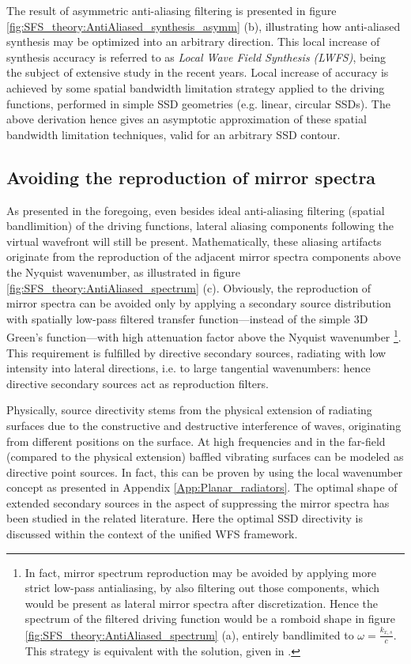 The result of asymmetric anti-aliasing filtering is presented in figure \ref{fig:SFS_theory:AntiAliased_synthesis_asymm} (b), illustrating how anti-aliased synthesis may be optimized into an arbitrary direction.
This local increase of synthesis accuracy is  referred to as \emph{Local Wave Field Synthesis (LWFS)}, being the subject of extensive study in the recent years. 
Local increase of accuracy is  achieved by some spatial bandwidth limitation strategy applied to the driving functions, performed in simple SSD geometries (e.g. linear, circular SSDs).
The above derivation hence gives an asymptotic approximation of these spatial bandwidth limitation techniques, valid for an arbitrary SSD contour.

\subsection{Avoiding the reproduction of mirror spectra}

As presented in the foregoing, even besides ideal anti-aliasing filtering (spatial bandlimition) of the driving functions, lateral aliasing components following the virtual wavefront will still be present.
Mathematically, these aliasing artifacts originate from the reproduction of the adjacent mirror spectra components above the Nyquist wavenumber, as illustrated in figure \ref{fig:SFS_theory:AntiAliased_spectrum} (c).
Obviously, the reproduction of mirror spectra can be avoided only by applying a secondary source distribution with spatially low-pass filtered transfer function---instead of the simple 3D Green's function---with high attenuation factor above the Nyquist wavenumber \footnote{In fact, mirror spectrum reproduction may be avoided by applying more strict low-pass antialiasing, by also filtering out those components, which would be present as lateral mirror spectra after discretization. 
Hence the spectrum of the filtered driving function would be a romboid shape in figure \ref{fig:SFS_theory:AntiAliased_spectrum}  (a), entirely bandlimited to $\omega = \frac{k_{x,s}}{c}$.
This strategy is equivalent with the solution, given in \cite{Winter2018:GeometricModel}.}.
This requirement is fulfilled by directive secondary sources, radiating with low intensity into lateral directions, i.e. to large tangential wavenumbers: hence directive secondary sources act as reproduction filters.

Physically, source directivity stems from the physical extension of radiating surfaces due to the constructive and destructive interference of waves, originating from different positions on the surface.
At high frequencies and in the far-field (compared to the physical extension) baffled vibrating surfaces can be modeled as directive point sources.
In fact, this can be proven by using the local wavenumber concept as presented in Appendix \ref{App:Planar_radiators}.
The optimal shape of extended secondary sources in the aspect of suppressing the mirror spectra has been studied in the related literature.
Here the optimal SSD directivity is discussed within the context of the unified WFS framework.

